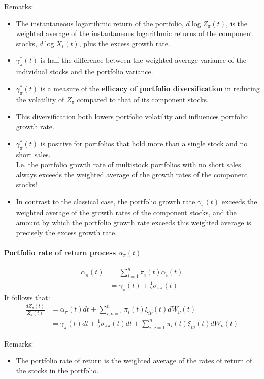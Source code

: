 \documentclass[a4paper,landscape,8pt,fleqn]{scrartcl}
\renewcommand{\emph}[1]{\textbf{#1}}
\begin{document}
\begin{multicols*}{3}
Remarks:
\begin{itemize}
\item The instantaneous logartihmic return of the portfolio, $d\log Z_\pi(t)$, is the weighted average of the instantaneous logarithmic returns of the component stocks, $d\log X_i(t)$, plus the excess growth rate.
\item $\gamma_\pi^\ast(t)$ is half the difference between the weighted-average variance of the individual stocks and the portfolio variance.
\item $\gamma_\pi^\ast(t)$ is a measure of the \emph{efficacy of portfolio diversification} in reducing the volatility of $Z_\pi$ compared to that of its component stocks.
\item This diversification both lowers portfolio volatility and influences portfolio growth rate.
\item $\gamma_\pi^\ast(t)$ is positive for portfolios that hold more than a single stock and no short sales. \\
I.e. the portfolio growth rate of multistock portfolios with no short sales always exceeds the weighted average of the growth rates of the component stocks!
\item In contrast to the classical case, the portfolio growth rate $\gamma_\pi(t)$ exceeds the weighted average of the growth rates of the component stocks, and the amount by which the portfolio growth rate exceeds this weighted average is precisely the excess growth rate.
\end{itemize}

\paragraph{Portfolio rate of return process $\alpha_\pi(t)$}

\begin{align*}
\alpha_\pi(t) &= \sum_{i=1}^n \pi_i(t) \alpha_i(t) \\
&= \gamma_\pi(t) + \frac{1}{2} \sigma_{\pi \pi}(t)
\end{align*}
It follows that:
\begin{align*}
\frac{d Z_\pi(t)}{Z_\pi(t)} &= \alpha_\pi(t) dt + \sum_{i, \nu =1}^n \pi_i(t) \xi_{i \nu}(t) dW_\nu(t) \\
&= \gamma_\pi(t) dt + \frac{1}{2} \sigma_{\pi \pi}(t) dt + \sum_{i, \nu =1}^n \pi_i(t) \xi_{i \nu}(t) dW_\nu(t)
\end{align*}

Remarks:
\begin{itemize}
\item The portfolio rate of return is the weighted average of the rates of return of the stocks in the portfolio.
\end{itemize}


\end{multicols*}
\end{document}
